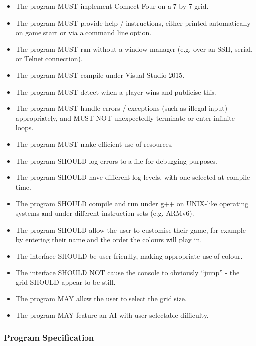 \documentclass[11pt,onecolumn]{article}
\begin{document}
\begin{itemize}
\item The program MUST implement Connect Four on a 7 by 7 grid.
\item The program MUST provide help / instructions, either printed automatically on game start or via a command line option.
\item The program MUST run without a window manager (e.g. over an SSH, serial, or Telnet connection).
\item The program MUST compile under Visual Studio 2015.
\item The program MUST detect when a player wins and publicise this.
\item The program MUST handle errors / exceptions (such as illegal input) appropriately, and MUST NOT unexpectedly terminate or enter infinite loops.
\item The program MUST make efficient use of resources.
\item The program SHOULD log errors to a file for debugging purposes.
\item The program SHOULD have different log levels, with one selected at compile-time.
\item The program SHOULD compile and run under g++ on UNIX-like operating systems and under different instruction sets (e.g. ARMv6).
\item The program SHOULD allow the user to customise their game, for example by entering their name and the order the colours will play in.
\item The interface SHOULD be user-friendly, making appropriate use of colour.
\item The interface SHOULD NOT cause the console to obviously ``jump'' - the grid SHOULD appear to be still.
\item The program MAY allow the user to select the grid size.
\item The program MAY feature an AI with user-selectable difficulty.
\end{itemize}

\subsubsection{Program Specification}

\end{document}

